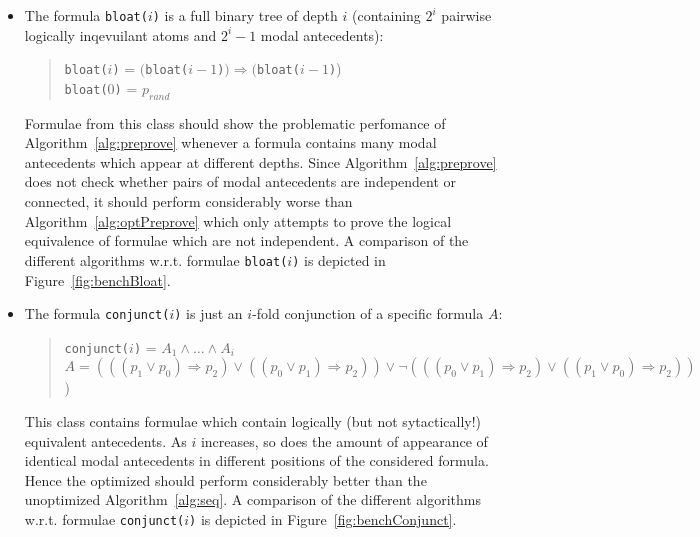 \documentclass{entcs} \usepackage{entcsmacro}
\begin{document}
\begin{itemize}
\item The formula \verb|bloat(|$i$\verb|)| is a full binary tree of depth $i$ (containing $2^i$ pairwise logically
inqevuilant atoms and $2^i-1$ modal antecedents):
\begin{quote}
\verb|bloat(|$i$\verb|)| = $($\verb|bloat(|$i-1$\verb|)|$)\Rightarrow($\verb|bloat(|$i-1$\verb|)|)\\
\verb|bloat(|$0$\verb|)| = $p_{rand}$
\end{quote}
Formulae from this class should show the problematic perfomance of Algorithm~\ref{alg:preprove} whenever
a formula contains many modal antecedents which appear at different depths. Since Algorithm~\ref{alg:preprove}
does not check whether pairs of modal antecedents are independent or connected, it should perform considerably worse
than Algorithm~\ref{alg:optPreprove} which only attempts to prove the logical equivalence of formulae which are not
independent. A comparison of the different algorithms w.r.t. formulae \verb|bloat(|$i$\verb|)| is depicted in
Figure~\ref{fig:benchBloat}.

\item The formula \verb|conjunct(|$i$\verb|)| is just an $i$-fold conjunction of a specific formula $A$:
\begin{quote}
\verb|conjunct(|$i$\verb|)| = $A_1\wedge\ldots\wedge A_i$\\
$A=(((p_1\vee p_0)\Rightarrow p_2)\vee((p_0\vee p_1)\Rightarrow p_2))\vee\neg(((p_0\vee p_1)\Rightarrow p_2)\vee((p_1\vee p_0)\Rightarrow p_2))$)
\end{quote}
This class contains formulae which contain logically (but not sytactically!) equivalent antecedents.
As $i$ increases, so does the amount of appearance of identical modal antecedents in different positions
of the considered formula. Hence the optimized should perform considerably better than the unoptimized
Algorithm~\ref{alg:seq}. A comparison of the different algorithms w.r.t. formulae \verb|conjunct(|$i$\verb|)| is depicted in
Figure~\ref{fig:benchConjunct}.


\end{itemize}
\end{document}
